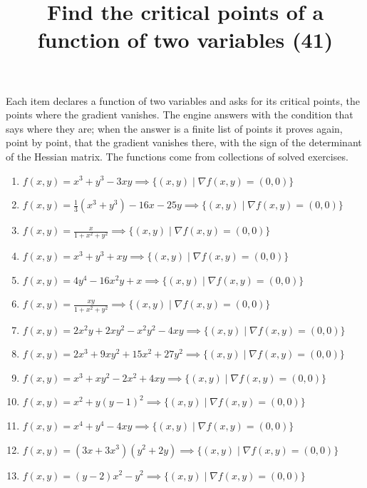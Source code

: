 \documentclass[11pt,a4paper]{article}
\title{Find the critical points of a function of two variables (41)}
\author{}
\date{}
\begin{document}
\maketitle
Each item declares a function of two variables and asks for its critical points, the points where the gradient vanishes. The engine answers with the condition that says where they are; when the answer is a finite list of points it proves again, point by point, that the gradient vanishes there, with the sign of the determinant of the Hessian matrix. The functions come from collections of solved exercises.

\begin{enumerate}
\item $\displaystyle f(x, y) = x^{3} + y^{3} - 3xy \implies \{(x, y) \mid \nabla f(x, y) = (0, 0)\}$
\item $\displaystyle f(x, y) = \frac{1}{3}(x^{3} + y^{3}) - 16x - 25y \implies \{(x, y) \mid \nabla f(x, y) = (0, 0)\}$
\item $\displaystyle f(x, y) = \frac{x}{1 + x^{2} + y^{2}} \implies \{(x, y) \mid \nabla f(x, y) = (0, 0)\}$
\item $\displaystyle f(x, y) = x^{3} + y^{3} + xy \implies \{(x, y) \mid \nabla f(x, y) = (0, 0)\}$
\item $\displaystyle f(x, y) = 4y^{4} - 16x^{2} y + x \implies \{(x, y) \mid \nabla f(x, y) = (0, 0)\}$
\item $\displaystyle f(x, y) = \frac{xy}{1 + x^{2} + y^{2}} \implies \{(x, y) \mid \nabla f(x, y) = (0, 0)\}$
\item $\displaystyle f(x, y) = 2x^{2} y + 2x y^{2} - x^{2} y^{2} - 4xy \implies \{(x, y) \mid \nabla f(x, y) = (0, 0)\}$
\item $\displaystyle f(x, y) = 2x^{3} + 9x y^{2} + 15x^{2} + 27y^{2} \implies \{(x, y) \mid \nabla f(x, y) = (0, 0)\}$
\item $\displaystyle f(x, y) = x^{3} + x y^{2} - 2x^{2} + 4xy \implies \{(x, y) \mid \nabla f(x, y) = (0, 0)\}$
\item $\displaystyle f(x, y) = x^{2} + y(y - 1)^{2} \implies \{(x, y) \mid \nabla f(x, y) = (0, 0)\}$
\item $\displaystyle f(x, y) = x^{4} + y^{4} - 4xy \implies \{(x, y) \mid \nabla f(x, y) = (0, 0)\}$
\item $\displaystyle f(x, y) = (3x + 3x^{3})(y^{2} + 2y) \implies \{(x, y) \mid \nabla f(x, y) = (0, 0)\}$
\item $\displaystyle f(x, y) = (y - 2) x^{2} - y^{2} \implies \{(x, y) \mid \nabla f(x, y) = (0, 0)\}$

\end{enumerate}
\end{document}

